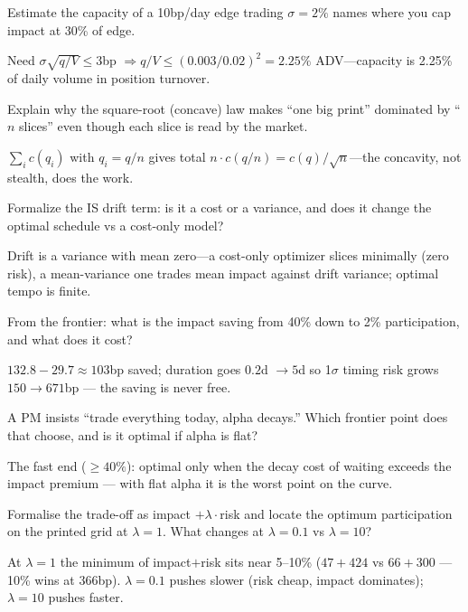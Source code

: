 \begin{exercise}[hard]
Estimate the capacity of a 10bp/day edge trading $\sigma=2\%$ names where you cap impact
at 30\% of edge.
\end{exercise}
\begin{solution}
Need $\sigma\sqrt{q/V}\le3$bp $\Rightarrow q/V\le(0.003/0.02)^2=2.25\%$ ADV---capacity is
2.25\% of daily volume in position turnover.
\end{solution}

\begin{exercise}[hard]
Explain why the square-root (concave) law makes ``one big print'' dominated by ``$n$
slices'' even though each slice is read by the market.
\end{exercise}
\begin{solution}
$\sum_i c(q_i)$ with $q_i=q/n$ gives total $n\cdot c(q/n)=c(q)/\sqrt n$---the concavity,
not stealth, does the work.
\end{solution}

\begin{exercise}[hard]
Formalize the IS drift term: is it a cost or a variance, and does it change the optimal
schedule vs a cost-only model?
\end{exercise}
\begin{solution}
Drift is a variance with mean zero---a cost-only optimizer slices minimally (zero risk),
a mean-variance one trades mean impact against drift variance; optimal tempo is finite.
\end{solution}

\begin{exercise}[easy]
From the frontier: what is the impact saving from 40\% down to
2\% participation, and what does it cost?
\end{exercise}
\begin{solution}
$132.8-29.7\approx103$bp saved; duration goes $0.2$d $\to 5$d so
1$\sigma$ timing risk grows $150\to671$bp --- the saving is
never free.
\end{solution}
\begin{exercise}[medium]
A PM insists ``trade everything today, alpha decays.'' Which
frontier point does that choose, and is it optimal if alpha is
flat?
\end{exercise}
\begin{solution}
The fast end ($\ge40\%$): optimal only when the decay cost of
waiting exceeds the impact premium --- with flat alpha it is
the worst point on the curve.
\end{solution}
\begin{exercise}[hard]
Formalise the trade-off as impact $+ \lambda\cdot$risk and locate
the optimum participation on the printed grid at $\lambda=1$.
What changes at $\lambda=0.1$ vs $\lambda=10$?
\end{exercise}
\begin{solution}
At $\lambda=1$ the minimum of impact$+$risk sits near 5--10\%
($47+424$ vs $66+300$ --- 10\% wins at $366$bp). $\lambda=0.1$
pushes slower (risk cheap, impact dominates); $\lambda=10$
pushes faster.
\end{solution}

